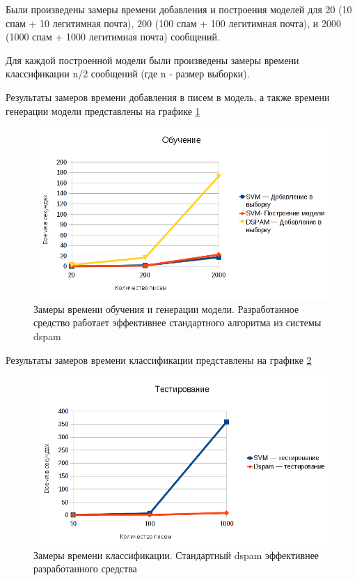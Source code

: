 Были произведены замеры времени добавления и построения моделей для 20 (10 спам + 10 легитимная почта), 200 (100 спам + 100 легитимная почта),  и 2000 (1000 спам + 1000 легитимная почта) сообщений.

Для каждой построенной модели были произведены замеры времени классификации n/2 сообщений (где n - размер выборки). 

Результаты замеров  времени добавления в писем в модель, а также  времени генерации модели  представлены на графике \ref{EXLEARNING}

\begin{figure}[h]
\begin{center}
\includegraphics[width=15cm]{img/learn}
\end{center}
\caption{Замеры времени обучения и генерации модели. Разработанное средство работает эффективнее стандартного алгоритма из системы dspam}
\label{EXLEARNING}
\end{figure}


Результаты замеров времени классификации представлены на графике \ref{EXTESTING}
\begin{figure}[h]
\begin{center}
\includegraphics[width=15cm]{img/testing}
\end{center}
\caption{Замеры времени классификации. Стандартный dspam эффективнее разработанного средства}
\label{EXTESTING}
\end{figure}

